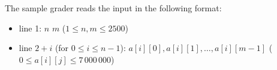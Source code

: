 The sample grader reads the input in the following format:
\begin{itemize}
\item line 1:  $n$ $m$ ($1 \leq n, m \leq  2500$)
\item line $2+i$ (for $0 \leq i \leq n-1$):  $a[i][0], a[i][1], \ldots, a[i][m-1]$ ($0 \leq a[i][j] \leq 7\,000\,000$)
\end{itemize}